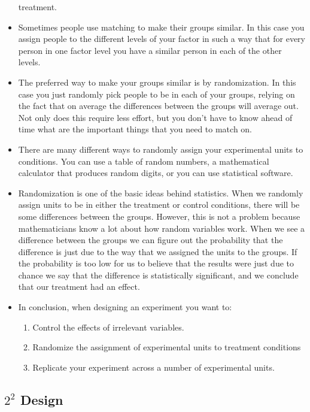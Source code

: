 \begin{itemize}
	treatment.
	\item Sometimes people use matching to make their groups similar. In this case you assign people to the
	different levels of your factor in such a way that for every person in one factor level you have a similar
	person in each of the other levels.
	\item The preferred way to make your groups similar is by randomization. In this case you just randomly
	pick people to be in each of your groups, relying on the fact that on average the differences between
	the groups will average out. Not only does this require less effort, but you don't have to know ahead
	of time what are the important things that you need to match on.
	\item There are many different ways to randomly assign your experimental units to conditions. You can use
	a table of random numbers, a mathematical calculator that produces random digits, or you can use
	statistical software.
	\item Randomization is one of the basic ideas behind statistics. When we randomly assign units to be in
	either the treatment or control conditions, there will be some differences between the groups. However,
	this is not a problem because mathematicians know a lot about how random variables work. When we
	see a difference between the groups we can figure out the probability that the difference is just due to
	the way that we assigned the units to the groups. If the probability is too low for us to believe that the
	results were just due to chance we say that the difference is statistically significant, and we conclude
	that our treatment had an effect.
	\item In conclusion, when designing an experiment you want to:
	\begin{enumerate}
		\item Control the effects of irrelevant variables.
		\item Randomize the assignment of experimental units to treatment conditions
		\item Replicate your experiment across a number of experimental units.
	\end{enumerate}
\end{itemize}




\subsection{ $2^2$ Design}

